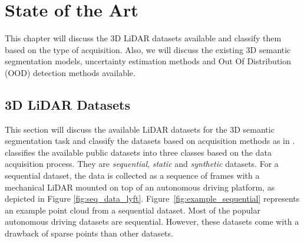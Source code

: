 

    \chapter{State of the Art}
    This chapter will discuss the 3D LiDAR datasets available and classify them based on the type of acquisition.
    Also, we will discuss the existing 3D semantic segmentation models, uncertainty estimation methods and Out Of Distribution (OOD) detection methods available.
    \section{3D LiDAR Datasets}
    This section will discuss the available LiDAR datasets for the 3D semantic segmentation task and classify the datasets based on acquisition methods as in \cite{survey3d}.
    \cite{survey3d} classifies the available public datasets into three classes based on the data acquisition process.
    They are \textit{sequential}, \textit{static} and \textit{synthetic} datasets.
    For a sequential dataset, the data is collected as a sequence of frames with a mechanical LiDAR mounted on top of an autonomous driving platform, as depicted in Figure \ref{fig:seq_data_lyft}.
    Figure~\ref{fig:example_sequential} represents an example point cloud from a sequential dataset.
    Most of the popular autonomous driving datasets are sequential. However, these datasets come with a drawback of sparse points than other datasets.
